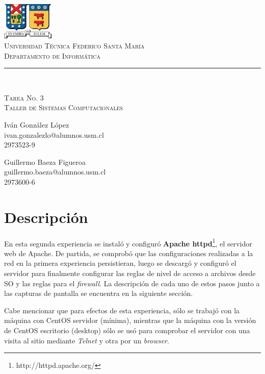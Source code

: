\documentclass[11pt]{article}
\makeatletter
\newcommand{\labno}{3}
\newcommand{\labtitle}{Taller de Sistemas Computacionales}
\newcommand{\nameone}{Iván González López}
\newcommand{\emailone}{ivan.gonzalezlo@alumnos.usm.cl}
\newcommand{\rolone}{2973523-9}
\newcommand{\nametwo}{Guillermo Baeza Figueroa}
\newcommand{\emailtwo}{guillermo.baeza@alumnos.usm.cl}
\newcommand{\roltwo}{2973600-6}
\makeatother
\begin{document}
\begin{titlepage}
\begin{center}


\includegraphics[width=70pt]{logos/utfsm.pdf} \\
{\Large \textsc{Universidad Técnica Federico Santa María} \\}
{\Large \textsc{Departamento de Informática} \\ \vspace{4pt}}
{\rule[13pt]{\textwidth}{1pt} \\ \vspace{25pt}}
{\LARGE \textsc{Tarea No. \labno} \\}
{\LARGE \textsc{\labtitle} \\ \vspace{50pt}}

\begin{minipage}{0.4\textwidth}
\begin{flushleft}
{\large \nameone} \\
\emailone \\
\rolone
\end{flushleft}
\end{minipage}
\hfill
\begin{minipage}{0.4\textwidth}
\begin{flushright}
{\large \nametwo} \\
\emailtwo \\
\roltwo
\end{flushright}
\end{minipage}
\end{center}
\end{titlepage}

\section{Descripción}
En esta segunda experiencia se instaló y configuró \textbf{Apache httpd}\footnote{http://httpd.apache.org/}, el servidor web de Apache. De partida, se comprobó que las configuraciones realizadas a la red en la primera experiencia persistieran, luego se descargó y configuró el servidor para finalmente configurar las reglas de nivel de acceso a archivos desde SO y las reglas para el \textit{firewall}. La descripción de cada uno de estos pasos junto a las capturas de pantalla se encuentra en la siguiente sección.\par
Cabe mencionar que para efectos de esta experiencia, sólo se trabajó con la máquina con CentOS servidor (mínima), mientras que la máquina con la versión de CentOS escritorio (desktop) sólo se usó para comprobar el servidor con una visita al sitio mediante \textit{Telnet} y otra por un \textit{browser}.
\end{document}
